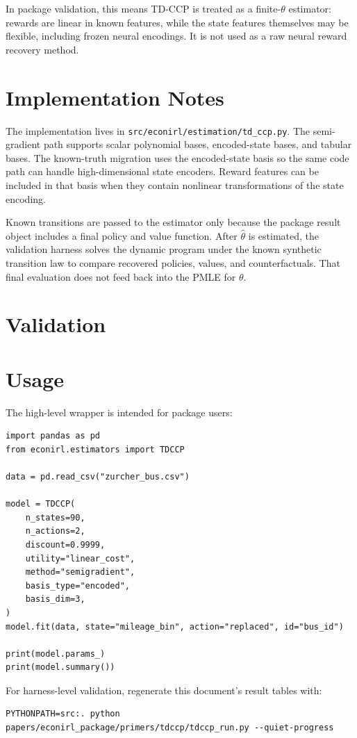 \documentclass[10pt]{article}
\begin{document}
In package validation, this means TD-CCP is treated as a finite-\(\theta\)
estimator: rewards are linear in known features, while the state features
themselves may be flexible, including frozen neural encodings. It is not used
as a raw neural reward recovery method.

\section{Implementation Notes}

The implementation lives in \texttt{src/econirl/estimation/td\_ccp.py}. The
semi-gradient path supports scalar polynomial bases, encoded-state bases, and
tabular bases. The known-truth migration uses the encoded-state basis so the
same code path can handle high-dimensional state encoders. Reward features can
be included in that basis when they contain nonlinear transformations of the
state encoding.

Known transitions are passed to the estimator only because the package result
object includes a final policy and value function. After \(\hat\theta\) is
estimated, the validation harness solves the dynamic program under the known
synthetic transition law to compare recovered policies, values, and
counterfactuals. That final evaluation does not feed back into the PMLE for
\(\theta\).

\section{Validation}



\section{Usage}

The high-level wrapper is intended for package users:

\begin{lstlisting}[basicstyle=\footnotesize\ttfamily]
import pandas as pd
from econirl.estimators import TDCCP

data = pd.read_csv("zurcher_bus.csv")

model = TDCCP(
    n_states=90,
    n_actions=2,
    discount=0.9999,
    utility="linear_cost",
    method="semigradient",
    basis_type="encoded",
    basis_dim=3,
)
model.fit(data, state="mileage_bin", action="replaced", id="bus_id")

print(model.params_)
print(model.summary())
\end{lstlisting}

For harness-level validation, regenerate this document's result tables with:
\begin{verbatim}
PYTHONPATH=src:. python papers/econirl_package/primers/tdccp/tdccp_run.py --quiet-progress
\end{verbatim}



\end{document}
